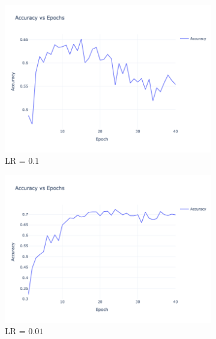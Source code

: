     \begin{figure}[htbp!]
    \centering
    \begin{subfigure}{0.32\textwidth}
    \centering
    \includegraphics[width=\textwidth]{images/CNN-3-valid-accuracy-lr_0.1.png}
    \caption{LR = $0.1$}
    \end{subfigure}
    \begin{subfigure}{0.32\textwidth}
    \centering
    \includegraphics[width=\textwidth]{images/CNN-3-valid-accuracy-lr_0.01.png}
    \caption{LR = $0.01$}
    \end{subfigure}
    \begin{subfigure}{0.32\textwidth}
    \centering

\end{subfigure}
\end{figure}
